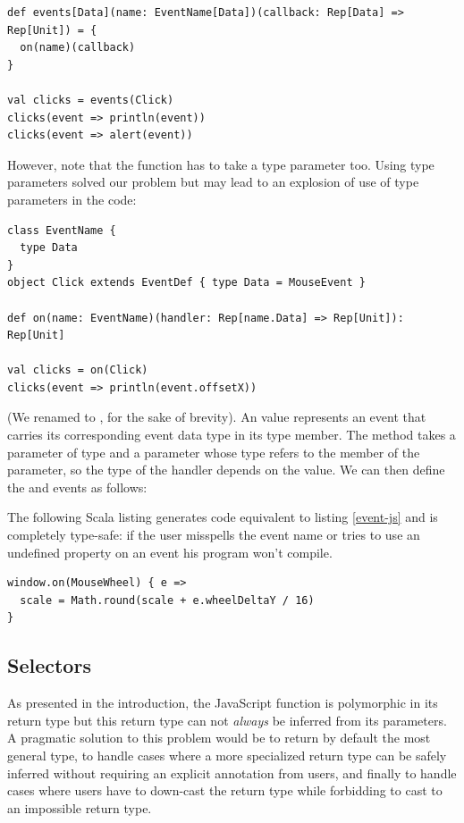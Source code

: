 \documentclass[runningheads,a4paper]{llncs}
\begin{document}
\begin{lstlisting}
def events[Data](name: EventName[Data])(callback: Rep[Data] => Rep[Unit]) = {
  on(name)(callback)
}

val clicks = events(Click)
clicks(event => println(event))
clicks(event => alert(event))
\end{lstlisting}

However, note that the  function has to take a type parameter too. Using type
parameters solved our problem but may lead to an explosion of use of type parameters in the code:

\begin{lstlisting}
class EventName {
  type Data
}
object Click extends EventDef { type Data = MouseEvent }

def on(name: EventName)(handler: Rep[name.Data] => Rep[Unit]): Rep[Unit]

val clicks = on(Click)
clicks(event => println(event.offsetX))
\end{lstlisting}

(We renamed  to , for the sake of brevity). An 
value represents an event that carries its corresponding event data type in its  type
member. The  method takes a parameter  of type  and a
 parameter whose type refers to the  member of the  parameter,
so the type of the handler depends on the  value. We can then define the  and
 events as follows:

The following Scala listing generates code equivalent to listing \ref{event-js} and is completely
type-safe: if the user misspells the event name or tries to use an undefined property on an event
his program won’t compile.

\begin{lstlisting}
window.on(MouseWheel) { e =>
  scale = Math.round(scale + e.wheelDeltaY / 16)
}
\end{lstlisting}

\subsection{Selectors}

As presented in the introduction, the JavaScript  function is polymorphic in
its return type but this return type can not \emph{always} be inferred from its parameters. A
pragmatic solution to this problem would be to return by default the most general type, to handle
cases where a more specialized return type can be safely inferred without requiring an explicit
annotation from users, and finally to handle cases where users have to down-cast the return type
while forbidding to cast to an impossible return type.
\end{document}
